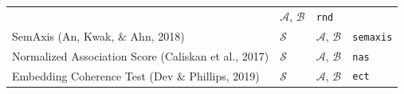 \documentclass[english,man]{apa6}
\begin{document}
\begin{longtable}[]{@{}llll@{}}
\begin{minipage}[t]{0.21\columnwidth}
\end{minipage} & \begin{minipage}[t]{0.21\columnwidth}\raggedright
\(\mathcal{A}\), \(\mathcal{B}\)\strut
\end{minipage} & \begin{minipage}[t]{0.08\columnwidth}\raggedright
\texttt{rnd}\strut
\end{minipage}\tabularnewline
\begin{minipage}[t]{0.39\columnwidth}\raggedright
SemAxis (An, Kwak, \& Ahn, 2018)\strut
\end{minipage} & \begin{minipage}[t]{0.21\columnwidth}\raggedright
\(\mathcal{S}\)\strut
\end{minipage} & \begin{minipage}[t]{0.21\columnwidth}\raggedright
\(\mathcal{A}\), \(\mathcal{B}\)\strut
\end{minipage} & \begin{minipage}[t]{0.08\columnwidth}\raggedright
\texttt{semaxis}\strut
\end{minipage}\tabularnewline
\begin{minipage}[t]{0.39\columnwidth}\raggedright
Normalized Association Score (Caliskan et al., 2017)\strut
\end{minipage} & \begin{minipage}[t]{0.21\columnwidth}\raggedright
\(\mathcal{S}\)\strut
\end{minipage} & \begin{minipage}[t]{0.21\columnwidth}\raggedright
\(\mathcal{A}\), \(\mathcal{B}\)\strut
\end{minipage} & \begin{minipage}[t]{0.08\columnwidth}\raggedright
\texttt{nas}\strut
\end{minipage}\tabularnewline
\begin{minipage}[t]{0.39\columnwidth}\raggedright
Embedding Coherence Test (Dev \& Phillips, 2019)\strut
\end{minipage} & \begin{minipage}[t]{0.21\columnwidth}\raggedright
\(\mathcal{S}\)\strut
\end{minipage} & \begin{minipage}[t]{0.21\columnwidth}\raggedright
\(\mathcal{A}\), \(\mathcal{B}\)\strut
\end{minipage} & \begin{minipage}[t]{0.08\columnwidth}\raggedright
\texttt{ect}\strut
\end{minipage}\tabularnewline

\end{longtable}
\end{document}
